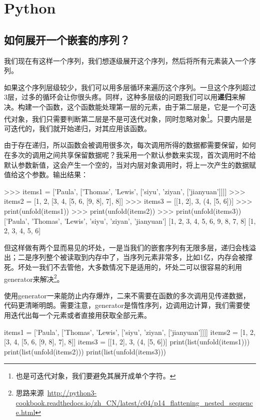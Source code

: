 \chapter{Python}

\section{如何展开一个嵌套的序列？}

我们现在有这样一个序列，我们想逐级展开这个序列，然后将所有元素装入一个序列。

如果这个序列层级较少，我们可以用多层循环来遍历这个序列。一旦这个序列超过3层，过多的循环会让你很头疼。同样，这种多层级的问题我们可以用\textbf{递归}来解决。构建一个函数，这个函数能处理第一层的元素，由于第二层是，它是一个可迭代对象，我们只需要判断第二层是不是可迭代对象，同时忽略对象\footnote{也是可迭代对象，我们要避免其展开成单个字符。}。只要内层是可迭代的，我们就开始递归，对其应用该函数。


由于存在递归，所以函数会被调用很多次，每次调用所得的数据都需要保留，如何在多次的调用之间共享保留数据呢？我采用一个默认参数来实现，首次调用时不给默认参数新值，这会产生一个空的，当对内层对象调用时，将上一次产生的数据赋值给这个参数。输出结果：

\begin{pythoncode}
>>> items1 = ['Paula', ['Thomas', 'Lewis', ['siyu', 'ziyan', ['jianyuan']]]]
>>> items2 = [1, 2, [3, 4, [5, 6, [9, 8], 7], 8]]
>>> items3 = [[1, 2], 3, (4, [5, 6])]
>>> print(unfold(items1))
>>> print(unfold(items2))
>>> print(unfold(items3))
['Paula', 'Thomas', 'Lewis', 'siyu', 'ziyan', 'jianyuan']
[1, 2, 3, 4, 5, 6, 9, 8, 7, 8]
[1, 2, 3, 4, 5, 6]
\end{pythoncode}

但这样做有两个显而易见的坏处，一是当我们的嵌套序列有无限多层，递归会栈溢出；二是序列整个被读取到内存中了，当序列元素非常多，比如1亿，内存会被撑死。坏处一我们不去管他，大多数情况下是适用的，坏处二可以很容易的利用generator来解决\footnote{思路来源~\url{http://python3-cookbook.readthedocs.io/zh_CN/latest/c04/p14_flattening_nested_sequence.html}}。


使用generator一来能防止内存爆炸，二来不需要在函数的多次调用见传递数据，代码更清晰明朗。需要注意，generator是惰性序列，边调用边计算，我们需要使用迭代出每一个元素或者直接用获取全部元素。

\begin{pythoncode}
items1 = ['Paula', ['Thomas', 'Lewis', ['siyu', 'ziyan', ['jianyuan']]]]
items2 = [1, 2, [3, 4, [5, 6, [9, 8], 7], 8]]
items3 = [[1, 2], 3, (4, [5, 6])]
print(list(unfold(items1)))
print(list(unfold(items2)))
print(list(unfold(items3)))
\end{pythoncode}